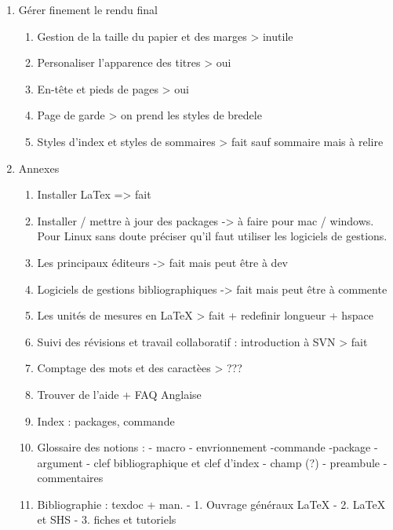 \begin{enumerate}
\item Gérer finement le rendu final
\begin{enumerate}
\item Gestion de la taille du papier et des marges		> inutile
\item Personaliser l'apparence des titres			> oui
\item En-tête et pieds de pages					> oui
\item Page de garde						> on prend les styles de bredele
\item Styles d'index et styles de	sommaires			> fait sauf sommaire mais à relire

\end{enumerate}

\item{Annexes}
\begin{enumerate}
\item Installer LaTex								=> fait
\item Installer / mettre à jour des packages							-> à faire pour mac / windows. Pour Linux sans doute préciser qu'il faut utiliser les logiciels de gestions.
\item Les principaux éditeurs							-> fait mais peut être à dev
\item Logiciels de gestions bibliographiques					-> fait mais peut être à commente	\item Les unités de mesures en LaTeX						> fait + redefinir longueur + hspace
\item Suivi des révisions et travail collaboratif : introduction à SVN	> fait
\item Comptage des mots et des caractèes					> ???
\item Trouver de l'aide + FAQ Anglaise
\item Index : packages, commande
\item Glossaire des notions :
	- macro
	- envrionnement
	-commande
	-package
	- argument
	- clef bibliographique et clef d'index
	- champ (?)
	- preambule
	- commentaires
\item Bibliographie : texdoc + man.
	- 1. Ouvrage généraux LaTeX
	- 2. LaTeX et SHS
	- 3. fiches et tutoriels
\end{enumerate}
\end{enumerate}
